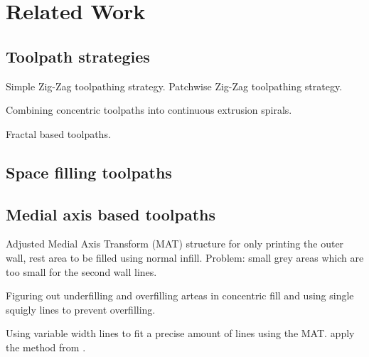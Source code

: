 \section{Related Work}

\subsection{Toolpath strategies}
Simple Zig-Zag toolpathing strategy. \cite{mcmains2000layered}
Patchwise Zig-Zag toolpathing strategy. \cite{Ding2014}

Combining concentric toolpaths into continuous extrusion spirals. \cite{Held2009}

Fractal based toolpaths. \cite{Griffiths1994, mandal2016}

\subsection{Space filling toolpaths}


\subsection{Medial axis based toolpaths}
Adjusted Medial Axis Transform (MAT) structure for only printing the outer wall, rest area to be filled using normal infill. \cite{Moesen2011}
Problem: small grey areas which are too small for the second wall lines.

Figuring out underfilling and overfilling arteas in concentric fill and using single squigly lines to prevent overfilling. \cite{Jin2017}

Using variable width lines to fit a precise amount of lines using the MAT.
\cite{Ding2016a} apply the method from \cite{kao1998optimal}.

